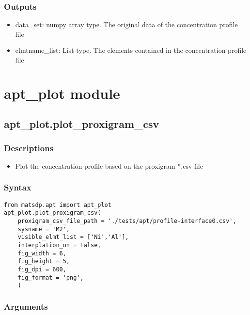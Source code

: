 \documentclass[12pt]{book}
\begin{document}
\subsubsection{Outputs}

\begin{itemize}
\item data\_set: numpy array type. The original data of the concentration profile file
\item elmtname\_list: List type. The elements contained in the concentration profile file
\end{itemize}

\section{apt\_plot module}

\subsection{apt\_plot.plot\_proxigram\_csv}

\subsubsection{Descriptions}
\begin{itemize}
\item Plot the concentration profile based on the proxigram *.csv file
\end{itemize}

\subsubsection{Syntax}
\begin{lstlisting}
from matsdp.apt import apt_plot
apt_plot.plot_proxigram_csv(
    proxigram_csv_file_path = './tests/apt/profile-interface0.csv',
    sysname = 'M2',
    visible_elmt_list = ['Ni','Al'],
    interplation_on = False,
    fig_width = 6,
    fig_height = 5,
    fig_dpi = 600,
    fig_format = 'png',
    )
\end{lstlisting}

\subsubsection{Arguments}
\end{document}
